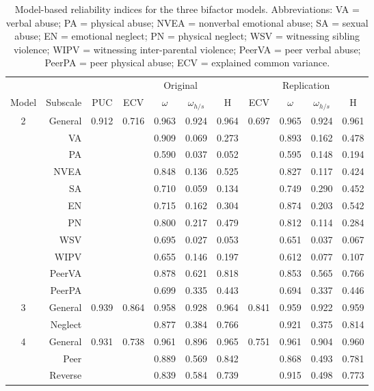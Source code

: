 \documentclass[letterpaper,man,natbib,floatsintext,longtable]{apa6}
\begin{document}
\begin{table}[h!]
\centering
\begin{tabular*}{\textwidth}{crccccccccc}
\toprule
& & & \multicolumn{4}{c}{Original} & \multicolumn{4}{c}{Replication} \\
\cmidrule(lr){4-7}\cmidrule(lr){8-11}
Model & Subscale & PUC & ECV & $\omega$ & $\omega_{h/s}$ & H & ECV & $\omega$ & $\omega_{h/s}$ & H \\
\midrule
2 & General &  0.912 & 0.716 &  0.963 &   0.924 &  0.964 & 0.697 & 0.965 & 0.924 & 0.961 \\
& VA        &        &       &  0.909 &   0.069 &  0.273 &       & 0.893 & 0.162 & 0.478 \\
& PA        &        &       &  0.590 &   0.037 &  0.052 &       & 0.595 & 0.148 & 0.194 \\
& NVEA      &        &       &  0.848 &   0.136 &  0.525 &       & 0.827 & 0.117 & 0.424 \\
& SA        &        &       &  0.710 &   0.059 &  0.134 &       & 0.749 & 0.290 & 0.452 \\
& EN        &        &       &  0.715 &   0.162 &  0.304 &       & 0.874 & 0.203 & 0.542 \\
& PN        &        &       &  0.800 &   0.217 &  0.479 &       & 0.812 & 0.114 & 0.284 \\
& WSV       &        &       &  0.695 &   0.027 &  0.053 &       & 0.651 & 0.037 & 0.067 \\
& WIPV      &        &       &  0.655 &   0.146 &  0.197 &       & 0.612 & 0.077 & 0.107 \\
& PeerVA    &        &       &  0.878 &   0.621 &  0.818 &       & 0.853 & 0.565 & 0.766 \\
& PeerPA    &        &       &  0.699 &   0.335 &  0.443 &       & 0.694 & 0.337 & 0.446 \\
\midrule
3 & General &  0.939 & 0.864 &  0.958 &   0.928 &  0.964 & 0.841 & 0.959 & 0.922 & 0.959 \\
& Neglect   &        &       &  0.877 &   0.384 &  0.766 &       & 0.921 & 0.375 & 0.814 \\
\midrule
4 & General &  0.931 & 0.738 &  0.961 &   0.896 &  0.965 & 0.751 & 0.961 & 0.904 & 0.960 \\
& Peer      &        &       &  0.889 &   0.569 &  0.842 &       & 0.868 & 0.493 & 0.781 \\
& Reverse   &        &       &  0.839 &   0.584 &  0.739 &       & 0.915 & 0.498 & 0.773 \\
\bottomrule
\end{tabular*}
\captionsetup{width=1.\textwidth}
\caption{\normalfont Model-based reliability indices for the three bifactor models. Abbreviations: VA = verbal abuse; PA = physical abuse; NVEA = nonverbal emotional abuse; SA = sexual abuse; EN = emotional neglect; PN = physical neglect; WSV = witnessing sibling violence; WIPV = witnessing inter-parental violence; PeerVA = peer verbal abuse; PeerPA = peer physical abuse; ECV = explained common variance.}
\label{table:reliability}
\end{table}
\end{document}
